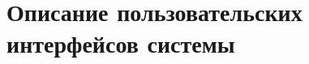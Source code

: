 \chapter{Описание пользовательских интерфейсов системы}
\begin{figure}[!htb]
\def\svgwidth{\columnwidth}
\caption{}
\label{ui_1}
\end{figure}

\begin{figure}[!htb]
\def\svgwidth{\columnwidth}
\caption{}
\label{ui_2}
\end{figure}

\begin{figure}[!htb]
\def\svgwidth{\columnwidth}
\caption{}
\label{ui_3}
\end{figure}

